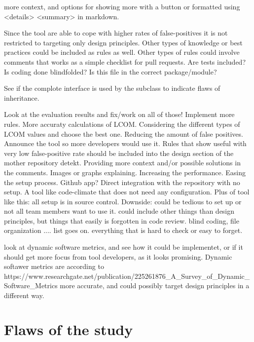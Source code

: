 \documentclass{report}
\begin{document}
more context, and options for showing more with a button or formatted using <details> <summary> in markdown.

Since the tool are able to cope with higher rates of false-positives it is not restricted to targeting only design principles. Other types of knowledge or best practices could be included as rules as well. Other types of rules could involve comments that works as a simple checklist for pull requests. Are tests included? Is coding done blindfolded? Is this file in the correct package/module?    

See if the complote interface is used by the subclass to indicate flaws of inheritance.



Look at the evaluation results and fix/work on all of those! 
Implement more rules. More accuraty calculations of LCOM. Considering the different types of LCOM values and choose the best one.
Reducing the amount of false positives.
Announce the tool so more developers would use it.
Rules that show useful with very low false-positive rate should be included into the design section of the mother repository detekt.
Providing more context and/or possible solutions in the comments. Images or graphs explaining.
Increasing the performance.
Easing the setup process. Github app? Direct integration with the repository with no setup. A tool like code-climate that does not need any configuration. Plus of tool like this: all setup is in source control. Downside: could be tedious to set up or not all team members want to use it.
could include other things than design principles, but things that easily is forgotten in code review. blind coding, file organization .... list goes on. everything that is hard to check or easy to forget. 

look at dynamic software metrics, and see how it could be implementet, or if it should get more focus from tool developers, as it looks promising. Dynamic softawer metrics are according to https://www.researchgate.net/publication/225261876_A_Survey_of_Dynamic_Software_Metrics more accurate, and could possibly target design principles in a different way.

\section{Flaws of the study}
\label{flaws-of-study}
\end{document}
